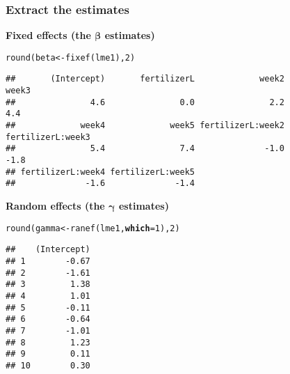 \documentclass[color=usenames,dvipsnames]{beamer}\usepackage[]{graphicx}\usepackage[]{color}
\makeatletter
\newcommand{\hlnum}[1]{\textcolor[rgb]{0.69,0.494,0}{#1}}%
\newcommand{\hlstd}[1]{\textcolor[rgb]{0,0,0}{#1}}%
\newcommand{\hlkwb}[1]{\textcolor[rgb]{0,0.341,0.682}{#1}}%
\newcommand{\hlkwc}[1]{\textcolor[rgb]{0,0,0}{\textbf{#1}}}%
\newcommand{\hlkwd}[1]{\textcolor[rgb]{0.004,0.004,0.506}{#1}}%
\newenvironment{kframe}{%
 \def\at@end@of@kframe{}%
 \ifinner\ifhmode%
  \def\at@end@of@kframe{\end{minipage}}%
  \begin{minipage}{\columnwidth}%
 \fi\fi%
 \def\FrameCommand##1{\hskip\@totalleftmargin \hskip-\fboxsep
 \colorbox{shadecolor}{##1}\hskip-\fboxsep
     \hskip-\linewidth \hskip-\@totalleftmargin \hskip\columnwidth}%
 \MakeFramed {\advance\hsize-\width
   \@totalleftmargin\z@ \linewidth\hsize
   \@setminipage}}%
 {\par\unskip\endMakeFramed%
 \at@end@of@kframe}
\newenvironment{knitrout}{}{} %
\makeatother
\begin{document}
\begin{frame}[fragile]
  \frametitle{Extract the estimates}
  {\bf Fixed effects (the $\bm \beta$ estimates)}
\begin{knitrout}\tiny
{}\color{fgcolor}\begin{kframe}
\begin{alltt}
\hlkwd{round}\hlstd{(beta} \hlkwb{<-} \hlkwd{fixef}\hlstd{(lme1),} \hlnum{2}\hlstd{)}
\end{alltt}
\begin{verbatim}
##       (Intercept)       fertilizerL             week2             week3 
##               4.6               0.0               2.2               4.4 
##             week4             week5 fertilizerL:week2 fertilizerL:week3 
##               5.4               7.4              -1.0              -1.8 
## fertilizerL:week4 fertilizerL:week5 
##              -1.6              -1.4
\end{verbatim}
\end{kframe}
\end{knitrout}
\pause
\vfill
  {\bf \normalsize Random effects (the $\bm \gamma$ estimates)}
\begin{knitrout}\tiny
{}\color{fgcolor}\begin{kframe}
\begin{alltt}
\hlkwd{round}\hlstd{(gamma} \hlkwb{<-} \hlkwd{ranef}\hlstd{(lme1,} \hlkwc{which}\hlstd{=}\hlnum{1}\hlstd{),} \hlnum{2}\hlstd{)}
\end{alltt}
\begin{verbatim}
##    (Intercept)
## 1        -0.67
## 2        -1.61
## 3         1.38
## 4         1.01
## 5        -0.11
## 6        -0.64
## 7        -1.01
## 8         1.23
## 9         0.11
## 10        0.30
\end{verbatim}
\end{kframe}
\end{knitrout}
\end{frame}
\end{document}
